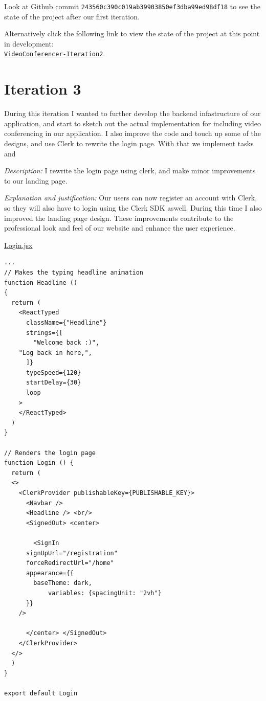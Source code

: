 Look at Github commit \texttt{243560c390c019ab39903850ef3dba99ed98df18} to see the state of the project after our first
iteration. \\ \vspace{0.2cm}

Alternatively click the following link to view the state of
the project at this point in development: \\
\href{https://github.com/zzzNathan/Video-Conferencer/tree/243560c390c019ab39903850ef3dba99ed98df18}{
\texttt{VideoConferencer-Iteration2}}.

\newpage

\section{Iteration 3}

During this iteration I wanted to further develop the backend
infastructure of our application, and start to sketch out the
actual implementation for including video conferencing in our
application. I also improve the code and touch up some of the
designs, and use Clerk to rewrite the login page. With that
we implement tasks  and  \\ \vspace{0.2cm}

\textit{Description:} I rewrite the login page using clerk,
and make minor improvements to our landing page. \\
\vspace{0.2cm}

\textit{Explanation and justification:} Our users can now
register an account with Clerk, so they will also have to
login using the Clerk SDK aswell. During this time I also
improved the landing page design. These improvements
contribute to the professional look and feel of our website
and enhance the user experience. \\ \vspace{0.2cm}

\underline{Login.jsx}

\begin{verbatim}
...
// Makes the typing headline animation
function Headline ()
{
  return (
    <ReactTyped
      className={"Headline"}
      strings={[
        "Welcome back :)",
	"Log back in here,",
      ]}
      typeSpeed={120}
      startDelay={30}
      loop
    >
    </ReactTyped>
  )
}

// Renders the login page
function Login () {
  return (
  <>
    <ClerkProvider publishableKey={PUBLISHABLE_KEY}>
      <Navbar />
      <Headline /> <br/>
      <SignedOut> <center>

        <SignIn
	  signUpUrl="/registration"
	  forceRedirectUrl="/home"
	  appearance={{
	    baseTheme: dark,
            variables: {spacingUnit: "2vh"}
	  }}
	/>

      </center> </SignedOut>
    </ClerkProvider>
  </>
  )
}

export default Login
\end{verbatim}

